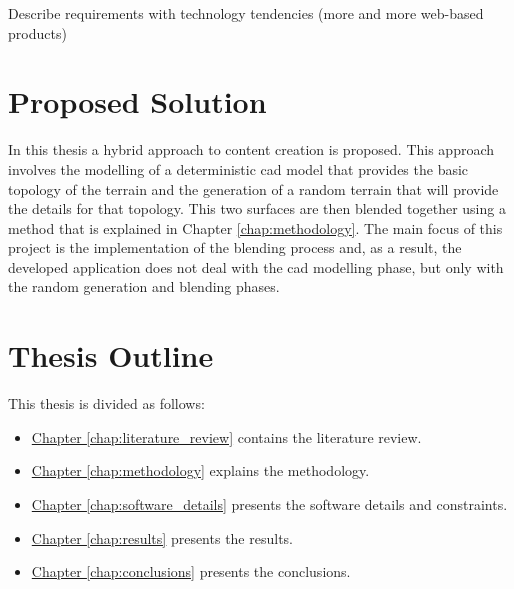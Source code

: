 \begin{notes}
  \item Describe requirements with technology tendencies (more and more web-based products)
\end{notes}

\section{Proposed Solution}

In this thesis a hybrid approach to content creation is proposed. This approach involves the modelling of a deterministic cad model that provides the basic topology of the terrain and the generation of a random terrain that will provide the details for that topology. This two surfaces are then blended together using a method that is explained in Chapter \ref{chap:methodology}. The main focus of this project is the implementation of the blending process and, as a result, the developed application does not deal with the cad modelling phase, but only with the random generation and blending phases.


\section{Thesis Outline}

This thesis is divided as follows:
\begin{itemize}
	\item \underline{Chapter \ref{chap:literature_review}} contains the literature review.
	\item \underline{Chapter \ref{chap:methodology}} explains the methodology.
	\item \underline{Chapter \ref{chap:software_details}} presents the software details and constraints.
	\item \underline{Chapter \ref{chap:results}} presents the results.
	\item \underline{Chapter \ref{chap:conclusions}} presents the conclusions.
\end{itemize}
